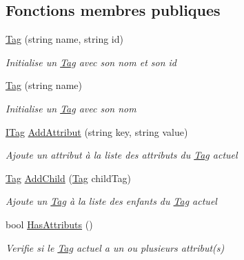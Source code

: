 \subsection*{Fonctions membres publiques}
\begin{DoxyCompactItemize}
\item 
\mbox{\hyperlink{class_m_t_connect_agent_1_1_model_1_1_tag_a7a97e2920ac3143e7e54ff26e5e43d0a}{Tag}} (string name, string id)
\begin{DoxyCompactList}\small\item\em Initialise un \mbox{\hyperlink{class_m_t_connect_agent_1_1_model_1_1_tag}{Tag}} avec son nom et son id \end{DoxyCompactList}\item 
\mbox{\hyperlink{class_m_t_connect_agent_1_1_model_1_1_tag_a52a0e7d9a403166030deed02bd876697}{Tag}} (string name)
\begin{DoxyCompactList}\small\item\em Initialise un \mbox{\hyperlink{class_m_t_connect_agent_1_1_model_1_1_tag}{Tag}} avec son nom \end{DoxyCompactList}\item 
\mbox{\hyperlink{interface_m_t_connect_agent_1_1_model_1_1_i_tag}{I\+Tag}} \mbox{\hyperlink{class_m_t_connect_agent_1_1_model_1_1_tag_ad39fa56fac8573b45c5d987288928e31}{Add\+Attribut}} (string key, string value)
\begin{DoxyCompactList}\small\item\em Ajoute un attribut à la liste des attributs du \mbox{\hyperlink{class_m_t_connect_agent_1_1_model_1_1_tag}{Tag}} actuel \end{DoxyCompactList}\item 
\mbox{\hyperlink{class_m_t_connect_agent_1_1_model_1_1_tag}{Tag}} \mbox{\hyperlink{class_m_t_connect_agent_1_1_model_1_1_tag_a74c01a8e302f87b611980b583e58b8c3}{Add\+Child}} (\mbox{\hyperlink{class_m_t_connect_agent_1_1_model_1_1_tag}{Tag}} child\+Tag)
\begin{DoxyCompactList}\small\item\em Ajoute un \mbox{\hyperlink{class_m_t_connect_agent_1_1_model_1_1_tag}{Tag}} à la liste des enfants du \mbox{\hyperlink{class_m_t_connect_agent_1_1_model_1_1_tag}{Tag}} actuel \end{DoxyCompactList}\item 
bool \mbox{\hyperlink{class_m_t_connect_agent_1_1_model_1_1_tag_a46dc1cce56e5d17f1826fdc53045f6ff}{Has\+Attributs}} ()
\begin{DoxyCompactList}\small\item\em Verifie si le \mbox{\hyperlink{class_m_t_connect_agent_1_1_model_1_1_tag}{Tag}} actuel a un ou plusieurs attribut(s) \end{DoxyCompactList}\item 

\end{DoxyCompactItemize}
